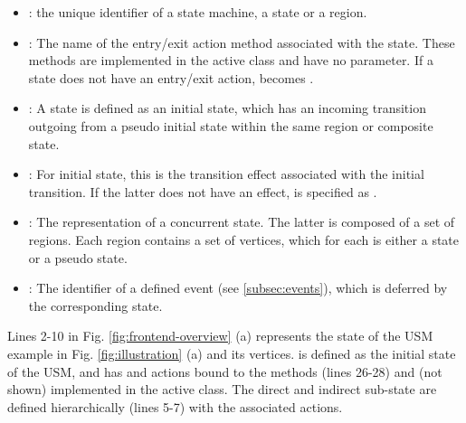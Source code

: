 \noindent
{}
\begin{itemize}[\footnotesize]
	\item {}: the unique identifier of a state machine, a state or a region.
	
	\item {}: The name of the entry/exit action method associated with the state. 
	These methods are implemented in the active class and have no parameter.
	If a state does not have an entry/exit action,  becomes .
	
	\item {}: A state is defined as an initial state, which has an incoming transition outgoing from a pseudo initial state within the same region or composite state. 
	
	\item {}: For initial state, this is the transition effect associated with the initial transition.
	If the latter does not have an effect,  is specified as .
	
	\item {}: The representation of a concurrent state. 
	The latter is composed of a set of regions.
	Each region contains a set of vertices, which for each is either a state or a pseudo state.
	
	\item {}: The identifier of a defined event (see \ref{subsec:events}), which is deferred by the corresponding state. 
\end{itemize}

\noindent
{}
Lines 2-10 in Fig. \ref{fig:frontend-overview} (a) represents the state  of the USM example in Fig. \ref{fig:illustration} (a) and its vertices.
 is defined as the initial state of the USM, and has  and  actions bound to the methods  (lines 26-28) and  (not shown) implemented in the active class.
The direct  and indirect  sub-state are defined hierarchically (lines 5-7) with the associated actions.

